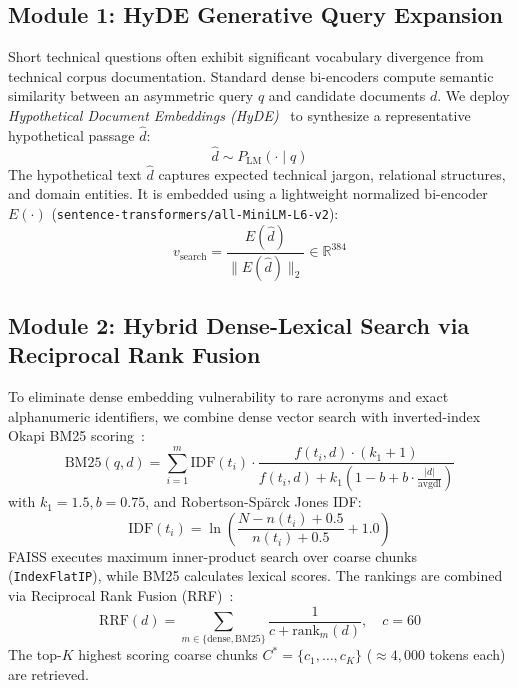 \documentclass[lettersize,journal]{IEEEtran}
\begin{document}
\subsection{Module 1: HyDE Generative Query Expansion}
Short technical questions often exhibit significant vocabulary divergence from technical corpus documentation. Standard dense bi-encoders compute semantic similarity between an asymmetric query $q$ and candidate documents $d$. We deploy \textit{Hypothetical Document Embeddings (HyDE)}~\cite{hyde} to synthesize a representative hypothetical passage $\hat{d}$:
\begin{equation}
\label{eq:hyde_sample}
\hat{d} \sim P_{\text{LM}}(\cdot \mid q)
\end{equation}
The hypothetical text $\hat{d}$ captures expected technical jargon, relational structures, and domain entities. It is embedded using a lightweight normalized bi-encoder $E(\cdot)$ (\texttt{sentence-transformers/all-MiniLM-L6-v2}):
\begin{equation}
\label{eq:dense_norm}
v_{\text{search}} = \frac{E(\hat{d})}{\|E(\hat{d})\|_2} \in \mathbb{R}^{384}
\end{equation}

\subsection{Module 2: Hybrid Dense-Lexical Search via Reciprocal Rank Fusion}
To eliminate dense embedding vulnerability to rare acronyms and exact alphanumeric identifiers, we combine dense vector search with inverted-index Okapi BM25 scoring~\cite{bm25}:
\begin{equation}
\label{eq:bm25}
\text{BM25}(q, d) = \sum_{i=1}^m \text{IDF}(t_i) \cdot \frac{f(t_i, d) \cdot (k_1 + 1)}{f(t_i, d) + k_1 \left(1 - b + b \cdot \frac{|d|}{\text{avgdl}}\right)}
\end{equation}
with $k_1 = 1.5, b = 0.75$, and Robertson-Spärck Jones IDF:
\begin{equation}
\label{eq:rsj_idf}
\text{IDF}(t_i) = \ln \left( \frac{N - n(t_i) + 0.5}{n(t_i) + 0.5} + 1.0 \right)
\end{equation}
FAISS executes maximum inner-product search over coarse chunks (\texttt{IndexFlatIP}), while BM25 calculates lexical scores. The rankings are combined via Reciprocal Rank Fusion (RRF)~\cite{rrf}:
\begin{equation}
\label{eq:rrf_fusion}
\text{RRF}(d) = \sum_{m \in \{\text{dense}, \text{BM25}\}} \frac{1}{c + \text{rank}_m(d)}, \quad c = 60
\end{equation}
The top-$K$ highest scoring coarse chunks $C^* = \{c_1, \dots, c_K\}$ ($\approx 4,000$ tokens each) are retrieved.
\end{document}
